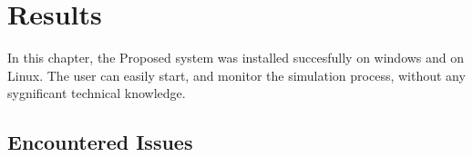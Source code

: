 \chapter{Results}
\label{chapter:5}
In this chapter, the
Proposed system was installed succesfully on windows and on Linux. The user can easily start, and monitor the simulation process, without any sygnificant technical knowledge.
\section{Encountered Issues}
